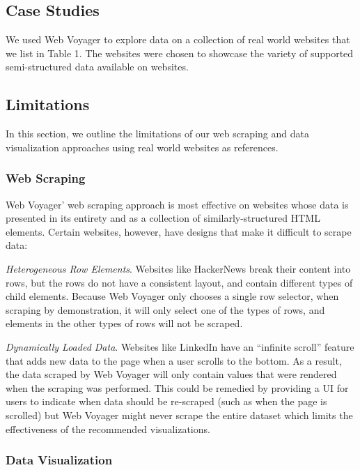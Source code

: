 \documentclass{vgtc}                          %
\begin{document}
\subsection{Case Studies}

We used Web Voyager to explore data on a collection of real world
websites that we list in Table 1. The websites were chosen to showcase
the variety of supported semi-structured data available on websites.

\subsection{Limitations}

In this section, we outline the limitations of our web scraping and data
visualization approaches using real world websites as references.

\subsubsection{Web Scraping}

Web Voyager' web scraping approach is most effective on websites whose
data is presented in its entirety and as a collection of similarly-structured HTML elements.
Certain websites, however, have designs that make it difficult to scrape
data:

\emph{Heterogeneous Row Elements}. Websites like HackerNews break their content into rows, but the rows do
not have a consistent layout, and contain different types of child
elements. Because Web Voyager only chooses a single row selector, when
scraping by demonstration, it will only select one of the types of rows,
and elements in the other types of rows will not be scraped.

\emph{Dynamically Loaded Data}. Websites like LinkedIn have an ``infinite scroll'' feature that adds new
data to the page when a user scrolls to the bottom. As a result, the
data scraped by Web Voyager will only contain values that were rendered
when the scraping was performed. This could be remedied by providing a UI for users
to indicate when data should be re-scraped (such as when the page is scrolled) but Web Voyager
might never scrape the entire dataset which limits the effectiveness of the recommended visualizations.

\subsubsection{Data Visualization}
\end{document}
